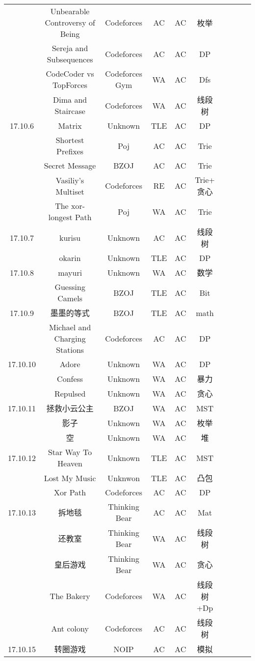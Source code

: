 \documentclass[landscape]{article}
\begin{document}
\begin{longtable}{cccccccccc}
  &Unbearable Controversy of Being& Codeforces &AC &AC& 枚举\\
  &Sereja and Subsequences &Codeforces& AC& AC& DP\\
  &CodeCoder vs TopForces &Codeforces Gym &WA &AC& Dfs\\
  &Dima and Staircase &Codeforces &WA &AC& 线段树\\
  \hline
  17.10.6 & Matrix & Unknown& TLE& AC& DP\\
  &Shortest Prefixes &Poj &AC& AC& Trie\\
  &Secret Message &BZOJ &AC& AC &Trie\\
  &Vasiliy’s Multiset &Codeforces& RE& AC& Trie+ 贪心\\
  & The xor-longest Path& Poj& WA& AC& Trie\\
  \hline
  17.10.7&kurisu& Unknown &AC& AC &线段树\\
  &okarin &Unknown &TLE &AC &DP\\
  \hline
  17.10.8 &mayuri &Unknown& WA &AC& 数学\\
  &Guessing Camels& BZOJ& TLE& AC& Bit\\
  \hline
  17.10.9 &墨墨的等式 &BZOJ &TLE &AC &math\\
  &Michael and Charging Stations &Codeforces &AC& AC& DP\\
  \hline
  17.10.10 &Adore &Unknown &WA &AC &DP\\
  &Confess &Unknown &WA &AC &暴力\\
  &Repulsed & Unknown& WA &AC& 贪心\\
  \hline
  17.10.11 &拯救小云公主& BZOJ &WA &AC &MST\\
  &影子& Unknown& WA &AC& 枚举\\
  &空 &Unknown &WA &AC& 堆\\
  \hline
  17.10.12 &Star Way To Heaven &Unknown & TLE &AC &MST\\
  &Lost My Music& Unknwon &TLE &AC& 凸包\\
  &Xor Path &Codeforces& AC &AC& DP\\
  \hline
  17.10.13 &拆地毯 &Thinking Bear &AC &AC &Mat\\
  &还教室 &Thinking Bear &WA &AC& 线段树\\
  &皇后游戏 &Thinking Bear &WA &AC &贪心\\
  &The Bakery &Codeforces &WA& AC &线段树+Dp\\
  &Ant colony &Codeforces& AC &AC& 线段树\\
  \hline
  17.10.15 &转圈游戏& NOIP &AC &AC& 模拟\\

\end{longtable}
\end{document}

